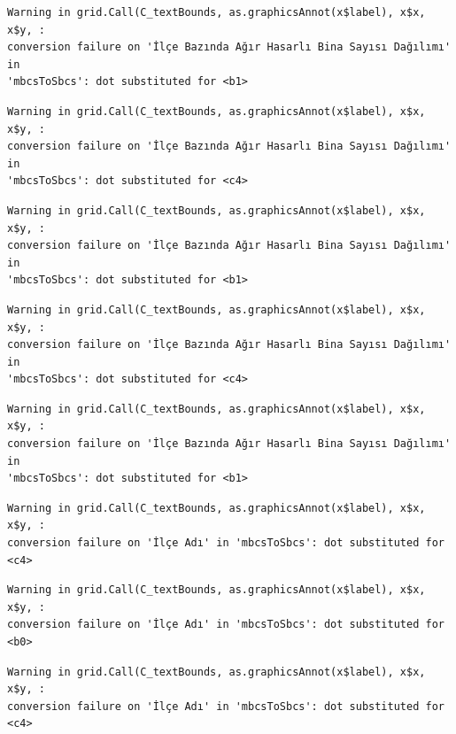 \documentclass[
  11pt,
  a4paper,
  DIV=11,
  numbers=noendperiod]{scrartcl}
\begin{document}
\begin{verbatim}
Warning in grid.Call(C_textBounds, as.graphicsAnnot(x$label), x$x, x$y, :
conversion failure on 'İlçe Bazında Ağır Hasarlı Bina Sayısı Dağılımı' in
'mbcsToSbcs': dot substituted for <b1>
\end{verbatim}

\begin{verbatim}
Warning in grid.Call(C_textBounds, as.graphicsAnnot(x$label), x$x, x$y, :
conversion failure on 'İlçe Bazında Ağır Hasarlı Bina Sayısı Dağılımı' in
'mbcsToSbcs': dot substituted for <c4>
\end{verbatim}

\begin{verbatim}
Warning in grid.Call(C_textBounds, as.graphicsAnnot(x$label), x$x, x$y, :
conversion failure on 'İlçe Bazında Ağır Hasarlı Bina Sayısı Dağılımı' in
'mbcsToSbcs': dot substituted for <b1>
\end{verbatim}

\begin{verbatim}
Warning in grid.Call(C_textBounds, as.graphicsAnnot(x$label), x$x, x$y, :
conversion failure on 'İlçe Bazında Ağır Hasarlı Bina Sayısı Dağılımı' in
'mbcsToSbcs': dot substituted for <c4>
\end{verbatim}

\begin{verbatim}
Warning in grid.Call(C_textBounds, as.graphicsAnnot(x$label), x$x, x$y, :
conversion failure on 'İlçe Bazında Ağır Hasarlı Bina Sayısı Dağılımı' in
'mbcsToSbcs': dot substituted for <b1>
\end{verbatim}

\begin{verbatim}
Warning in grid.Call(C_textBounds, as.graphicsAnnot(x$label), x$x, x$y, :
conversion failure on 'İlçe Adı' in 'mbcsToSbcs': dot substituted for <c4>
\end{verbatim}

\begin{verbatim}
Warning in grid.Call(C_textBounds, as.graphicsAnnot(x$label), x$x, x$y, :
conversion failure on 'İlçe Adı' in 'mbcsToSbcs': dot substituted for <b0>
\end{verbatim}

\begin{verbatim}
Warning in grid.Call(C_textBounds, as.graphicsAnnot(x$label), x$x, x$y, :
conversion failure on 'İlçe Adı' in 'mbcsToSbcs': dot substituted for <c4>
\end{verbatim}
\end{document}

